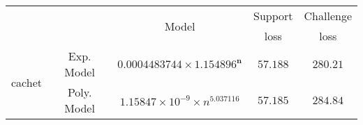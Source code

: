 \begin{tabular}{ccccc} 
\hline 
 &  & \multirow{2}{*}{Model} & Support & Challenge\tabularnewline 
 &  &  & loss  & loss\tabularnewline 
\hline 
\hline 
\multirow{2}{*}{cachet} & Exp. Model & $\mathbf{0.0004483744\times 1.154896^{n}}$ & $\mathbf{57.188}$ & $\mathbf{280.21}$ \tabularnewline 
 & Poly. Model & $1.15847\times10^{-9}\times n^{5.037116}$ & $57.185$ & $284.84$ \tabularnewline 
\hline 
\end{tabular} 

